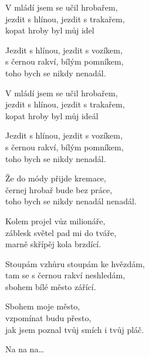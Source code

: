 
\ve{}
V mládí jsem se učil hrobařem,\\
jezdit s hlínou, jezdit s trakařem,\\
kopat hroby byl můj idel

\ve{}
Jezdit s hlínou, jezdit s vozíkem,\\
s černou rakví, bílým pomníkem,\\
toho bych se nikdy nenadál.

\ve{}
V mládí jsem se učil hrobařem,\\
jezdit s hlínou, jezdit s trakařem,\\
kopat hroby byl můj ideál

\ve{}
Jezdit s hlínou, jezdit s vozíkem,\\
s černou rakví, bílým pomníkem,\\
toho bych se nikdy nenadál.

\ve{}
Že do módy přijde kremace,\\
černej hrobař bude bez práce,\\
toho bych se nikdy nenadál nenadál.

\ve{}
Kolem projel vůz milionáře,\\
záblesk světel pad mi do tváře,\\
marně skřípěj kola brzdící.

\ve{}
Stoupám vzhůru stoupám ke hvězdám,\\
tam se s černou rakví neshledám,\\
sbohem bílé město zářící.

\ve{}
Sbohem moje město,\\
vzpomínat budu přesto,\\
jak jsem poznal tvůj smích i tvůj pláč.

\ve{}
Na na na\ldots 

\esong